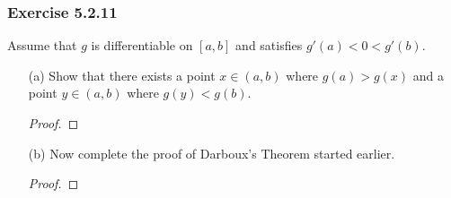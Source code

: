 \subsubsection{Exercise 5.2.11} Assume that \( g  \) is differentiable on \( [a,b] \) and satisfies \( g'(a) < 0 < g'(b)  \).
\begin{enumerate}
    \item[(a)] Show that there exists a point \( x \in (a,b)  \) where \( g(a) > g(x)  \) and a point \( y \in (a,b)  \) where \( g(y) < g(b) \).
        \begin{proof}
        
        \end{proof}
    \item[(b)] Now complete the proof of  Darboux's Theorem started earlier.
        \begin{proof}
        
        \end{proof}
\end{enumerate}




